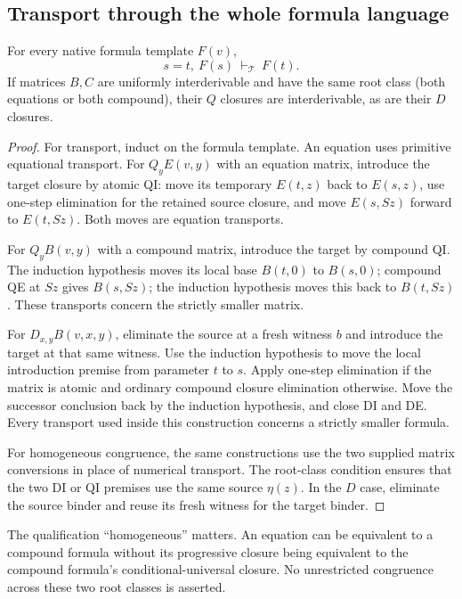 \subsection{Transport through the whole formula language}
\label{target:full-transport-section}

\begin{lemma}
\label{target:full-transport}
For every native formula template $F(v)$,
\[
 s=t,\ F(s)\ \vdash_{\mathcal T}\ F(t).
\]
If matrices $B,C$ are uniformly interderivable and have the same root class
(both equations or both compound), their $Q$ closures are interderivable,
as are their $D$ closures.
\end{lemma}
\begin{proof}
For transport, induct on the formula template.  An equation uses primitive
equational transport.  For $Q_yE(v,y)$ with an equation matrix, introduce
the target closure by atomic QI: move its temporary $E(t,z)$ back to
$E(s,z)$, use one-step elimination for the retained source closure, and
move $E(s,Sz)$ forward to $E(t,Sz)$.  Both moves are equation transports.

For $Q_yB(v,y)$ with a compound matrix, introduce the target by compound
QI.  The induction hypothesis moves its local base $B(t,0)$ to $B(s,0)$;
compound QE at $Sz$ gives $B(s,Sz)$; the induction hypothesis moves this
back to $B(t,Sz)$.  These transports concern the strictly smaller matrix.

For $D_{x,y}B(v,x,y)$, eliminate the source at a fresh witness $b$ and
introduce the target at that same witness.  Use the induction hypothesis
to move the local introduction premise from parameter $t$ to $s$.  Apply
one-step elimination if the matrix is atomic and ordinary compound closure
elimination otherwise.  Move the successor conclusion back by the induction
hypothesis, and close DI and DE.  Every transport used inside this
construction concerns a strictly smaller formula.

For homogeneous congruence, the same constructions use the two supplied
matrix conversions in place of numerical transport.  The root-class
condition ensures that the two DI or QI premises use the same source
$\eta(z)$.  In the $D$ case, eliminate the source binder and reuse its fresh
witness for the target binder.
\end{proof}

The qualification ``homogeneous'' matters.  An equation can be equivalent
to a compound formula without its progressive closure being equivalent to
the compound formula's conditional-universal closure.  No unrestricted
congruence across these two root classes is asserted.

